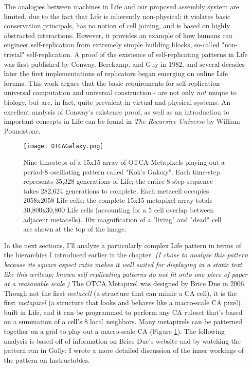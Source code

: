 {The analogies between machines in Life and our proposed assembly system are limited, due to the fact that Life is inherently non-physical; it violates basic conservation principals, has no notion of cell joining, and is based on highly abstracted interactions.  However, it provides an example of how humans can engineer self-replication from extremely simple building blocks, so-called "non-trivial" self-replication.  A proof of the existence of self-replicating patterns in Life was first published by Conway, Berekamp, and Guy in 1982\cite{Berekamp1982}, and several decades later the first implementations of replicators began emerging on online Life forums\cite{Greene2013a}.  This work argues that the basic requirements for self-replication - universal computation and universal construction - are not only \textit{not} unique to biology, but are, in fact, quite prevalent in virtual and physical systems.  An excellent analysis of Conway's existence proof, as well as an introduction to important concepts in Life can be found in \textit{The Recursive Universe} by William Poundstone\cite{Poundstone1985}.\\

\begin{figure}
  \texttt{[image: OTCAGalaxy.png]}
  \caption{Nine timesteps of a 15x15 array of OTCA Metapixels playing out a period-8 oscillating pattern called "Kok's Galaxy".  Each time-step represents 35,328 generations of Life; the entire 8 step sequence takes 282,624 generations to complete.  Each metacell occupies 2058x2058 Life cells; the complete 15x15 metapixel array totals 30,800x30,800 Life cells (accounting for a 5 cell overlap between adjacent metacells).  10x magnification of a "living" and "dead" cell are shown at the top of the image.}
  \label{fig:OTCAGalaxy}
\end{figure}

In the next sections, I'll analyze a particularly complex Life pattern in terms of the hierarchies I introduced earlier in the chapter.  \textit{(I chose to analyze this pattern because its square aspect ratio makes it well suited for displaying in a static text like this writeup; known self-replicating patterns do not fit onto one piece of paper at a reasonable scale.)}  The OTCA Metapixel was designed by Brice Due in 2006.  Though not the first \textit{metacell} (a structure that can mimic a CA cell), it is the first \textit{metapixel} (a structure that looks and behaves like a macro-scale CA pixel) built in Life, and it can be programmed to perform any CA ruleset that's based on a summation of a cell's 8 local neighbors.  Many metapixels can be patterned together on a grid to play out a macro-scale CA (Figure \ref{fig:OTCAGalaxy}).  The following analysis is based off of information on Brice Due's website\cite{Due2006} and by watching the pattern run in Golly; I wrote a more detailed discussion of the inner workings of the pattern on Instructables\cite{Ghassaei2015}.

}
